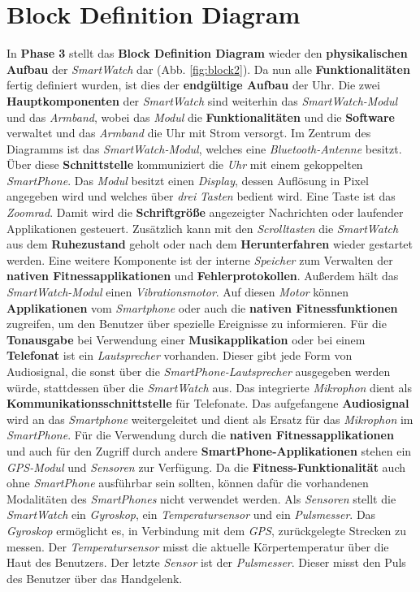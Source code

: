 \section{Block Definition Diagram}
In \textbf{Phase 3} stellt das \textbf{Block Definition Diagram} wieder den \textbf{physikalischen Aufbau} der \textit{SmartWatch} dar (Abb. \ref{fig:block2}). Da nun alle \textbf{Funktionalitäten} fertig definiert wurden, ist dies der \textbf{endgültige Aufbau} der Uhr. Die zwei \textbf{Hauptkomponenten} der \textit{SmartWatch} sind weiterhin das \textit{SmartWatch-Modul} und das \textit{Armband}, wobei das \textit{Modul} die \textbf{Funktionalitäten} und die \textbf{Software} verwaltet und das \textit{Armband} die Uhr mit Strom versorgt. Im Zentrum des Diagramms ist das \textit{SmartWatch-Modul}, welches eine \textit{Bluetooth-Antenne} besitzt. Über diese \textbf{Schnittstelle} kommuniziert die \textit{Uhr} mit einem gekoppelten \textit{SmartPhone}. Das \textit{Modul} besitzt einen \textit{Display}, dessen Auflösung in Pixel angegeben wird und welches über \textit{drei} \textit{Tasten} bedient wird. Eine Taste ist das \textit{Zoomrad}. Damit wird die \textbf{Schriftgröße} angezeigter Nachrichten oder laufender Applikationen gesteuert. Zusätzlich kann mit den \textit{Scrolltasten} die \textit{SmartWatch} aus dem \textbf{Ruhezustand} geholt oder nach dem \textbf{Herunterfahren} wieder gestartet werden. Eine weitere Komponente ist der interne \textit{Speicher} zum Verwalten der \textbf{nativen Fitnessapplikationen} und \textbf{Fehlerprotokollen}. Außerdem hält das \textit{SmartWatch-Modul} einen \textit{Vibrationsmotor}. Auf diesen \textit{Motor} können \textbf{Applikationen} vom \textit{Smartphone} oder auch die \textbf{nativen Fitnessfunktionen} zugreifen, um den Benutzer über spezielle Ereignisse zu informieren. Für die \textbf{Tonausgabe} bei Verwendung einer \textbf{Musikapplikation} oder bei einem \textbf{Telefonat} ist ein \textit{Lautsprecher} vorhanden. Dieser gibt jede Form von Audiosignal, die sonst über die \textit{SmartPhone-Lautsprecher} ausgegeben werden würde, stattdessen über die \textit{SmartWatch} aus. Das integrierte \textit{Mikrophon} dient als \textbf{Kommunikationsschnittstelle} für Telefonate. Das aufgefangene \textbf{Audiosignal} wird an das \textit{Smartphone} weitergeleitet und dient als Ersatz für das \textit{Mikrophon} im \textit{SmartPhone}. Für die Verwendung durch die \textbf{nativen Fitnessapplikationen} und auch für den Zugriff durch andere \textbf{SmartPhone-Applikationen} stehen ein \textit{GPS-Modul} und \textit{Sensoren} zur Verfügung. Da die \textbf{Fitness-Funktionalität} auch ohne \textit{SmartPhone} ausführbar sein sollten, können dafür die vorhandenen Modalitäten des \textit{SmartPhones} nicht verwendet werden. Als \textit{Sensoren} stellt die \textit{SmartWatch} ein \textit{Gyroskop}, ein \textit{Temperatursensor} und ein \textit{Pulsmesser}. Das \textit{Gyroskop} ermöglicht es, in Verbindung mit dem \textit{GPS}, zurückgelegte Strecken zu messen. Der \textit{Temperatursensor} misst die aktuelle Körpertemperatur über die Haut des Benutzers. Der letzte \textit{Sensor} ist der \textit{Pulsmesser}. Dieser misst den Puls des Benutzer über das Handgelenk.\\
